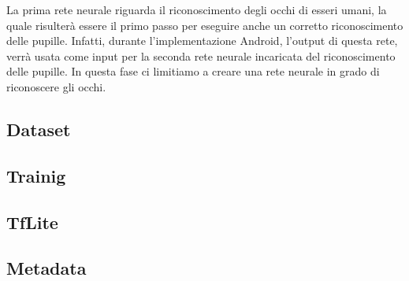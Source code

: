 La prima rete neurale riguarda il riconoscimento degli occhi di esseri umani, la quale risulterà essere il primo passo per eseguire anche un corretto riconoscimento delle pupille. Infatti, durante l'implementazione Android, l'output di questa rete, verrà usata come input per la seconda rete neurale incaricata del riconoscimento delle pupille. In questa fase ci limitiamo a creare una rete neurale in grado di riconoscere gli occhi.

\subsection{Dataset}
\label{sub:eyedataset}


\subsection{Trainig}
\label{sub:eyetraining}


\subsection{TfLite}
\label{sub:eyetflite}


\subsection{Metadata}
\label{sub:eyemetadata}
